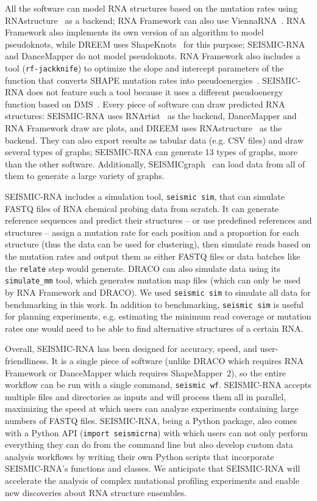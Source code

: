 \documentclass[11pt]{article}
\begin{document}
All the software can model RNA structures based on the mutation rates using RNAstructure~\cite{Reuter2010} as a backend; RNA Framework can also use ViennaRNA~\cite{Lorenz2011}.
RNA Framework also implements its own version of an algorithm to model pseudoknots, while DREEM uses ShapeKnots~\cite{Hajdin2013} for this purpose; SEISMIC-RNA and DanceMapper do not model pseudoknots.
RNA Framework also includes a tool (\verb|rf-jackknife|) to optimize the slope and intercept parameters of the function that converts SHAPE mutation rates into pseudoenergies~\cite{Deigan2009}. SEISMIC-RNA does not feature such a tool because it uses a different pseudoenergy function based on DMS~\cite{Cordero2012}.
Every piece of software can draw predicted RNA structures: SEISMIC-RNA uses RNArtist~\cite{RNArtistCore} as the backend, DanceMapper and RNA Framework draw arc plots, and DREEM uses RNAstructure~\cite{Reuter2010} as the backend. They can also export results as tabular data (e.g. CSV files) and draw several types of graphs; SEISMIC-RNA can generate 13 types of graphs, more than the other software.
Additionally, SEISMICgraph~\cite{FuchsWightman2025} can load data from all of them to generate a large variety of graphs.

SEISMIC-RNA includes a simulation tool, \verb|seismic sim|, that can simulate FASTQ files of RNA chemical probing data from scratch. It can generate reference sequences and predict their structures -- or use predefined references and structures -- assign a mutation rate for each position and a proportion for each structure (thus the data can be used for clustering), then simulate reads based on the mutation rates and output them as either FASTQ files or data batches like the \verb|relate| step would generate.
DRACO can also simulate data using its \verb|simulate_mm| tool, which generates mutation map files (which can only be used by RNA Framework and DRACO).
We used \verb|seismic sim| to simulate all data for benchmarking in this work. In addition to benchmarking, \verb|seismic sim| is useful for planning experiments, e.g. estimating the minimum read coverage or mutation rates one would need to be able to find alternative structures of a certain RNA.

Overall, SEISMIC-RNA has been designed for accuracy, speed, and user-friendliness. 
It is a single piece of software (unlike DRACO which requires RNA Framework or DanceMapper which requires ShapeMapper~2), so the entire workflow can be run with a single command, \verb|seismic wf|.
SEISMIC-RNA accepts multiple files and directories as inputs and will process them all in parallel, maximizing the speed at which users can analyze experiments containing large numbers of FASTQ files.
SEISMIC-RNA, being a Python package, also comes with a Python API (\verb|import seismicrna|) with which users can not only perform everything they can do from the command line but also develop custom data analysis workflows by writing their own Python scripts that incorporate SEISMIC-RNA's functions and classes.
We anticipate that SEISMIC-RNA will accelerate the analysis of complex mutational profiling experiments and enable new discoveries about RNA structure ensembles.
\end{document}
